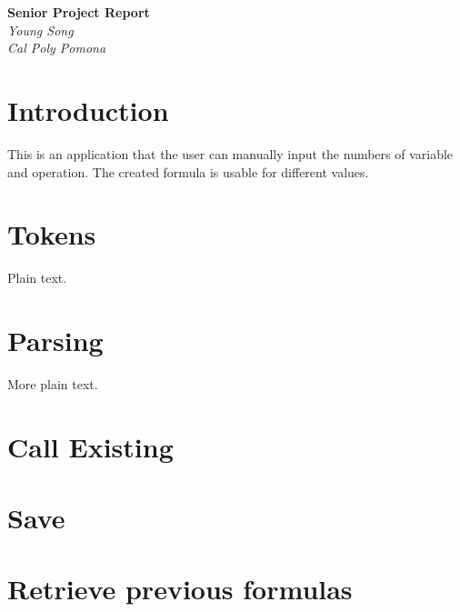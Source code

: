 \documentclass{article}
\begin{document}
\begin{titlepage}
   \begin{center}
      \Large\textbf{Senior Project Report}\\[2in]
      \large\textit{Young Song}\\[2in]
      \large\textit{Cal Poly Pomona}
   \end{center}
\end{titlepage}

\section{Introduction}
This is an application that the user can manually input the numbers of variable
and operation. The created formula is usable for different values.
\section{Tokens}

Plain text.

\section{Parsing}

More plain text.
\section{Call Existing}
\section{Save}
\section{Retrieve previous formulas}
\end{document}
